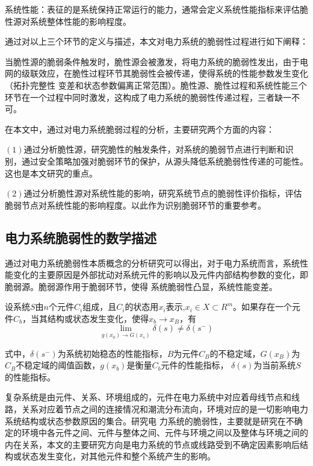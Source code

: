 系统性能：表征的是系统保持正常运行的能力，通常会定义系统性能指标来评估脆性源对系统整体性能的影响程度。

通过对以上三个环节的定义与描述，本文对电力系统的脆弱性过程进行如下阐释：

当脆性源的脆弱条件触发时，脆性源会被激发，将电力系统的脆弱性发出，由于电网的级联效应，在脆性过程环节其脆弱性会被传递，使得系统的性能参数发生变化（拓扑完整性
变差和状态参数偏离正常范围）。脆性源、脆性过程和系统性能三个环节在一个过程中同时激发，这构成了电力系统的脆弱性传递过程，三者缺一不可。

在本文中，通过对电力系统脆弱过程的分析，主要研究两个方面的内容：

$(1)$通过分析脆性源，研究脆性的触发条件，对系统的脆弱节点进行判断和识别，通过安全策略加强对脆弱环节的保护，从源头降低系统脆弱性传递的可能性。这也是本文研究的重点。

$(2)$通过分析脆性源对系统性能的影响，研究系统节点的脆弱性评价指标，评估脆弱节点对系统性能的影响程度。以此作为识别脆弱环节的重要参考。



\subsection{电力系统脆弱性的数学描述}
\label{sec:describtion}

通过对电力系统脆弱性本质概念的分析研究可以得出，对于电力系统而言，系统性能变化的主要原因是外部扰动对系统元件的影响以及元件内部结构参数的变化，即脆弱源。脆弱源作用于脆弱环节，使得
系统脆弱性凸显，系统性能变差。

设系统$S$由$n$个元件$C_i$组成，且$C_i$的状态用$x_i$表示,$x_i \in X \subset R^m$。如果存在一个元件$C_b$，当其结构或状态发生变化，使得$x_b \to x_B$，有
\begin{equation}
  \lim _{g\left(x_{0}\right) \rightarrow G\left(x_{s}\right)} \delta(s) \neq \delta\left(s^{-}\right)
  \end{equation}
 
式中，$\delta\left(s^{-}\right)$为系统初始稳态的性能指标，$B$为元件$C_B$的不稳定域，$G\left(x_{B}\right)$为$C_B$不稳定域的阈值函数，$g(x_b)$是衡量$C_b$元件的性能指标，
$\delta\left(s\right)$为当前系统$S$的性能指标。

复杂系统是由元件、关系、环境组成的，元件在电力系统中对应着母线节点和线路，关系对应着节点之间的连接情况和潮流分布流向，环境对应的是一切影响电力系统结构或状态参数原因的集合。研究电
力系统的脆弱性，主要就是研究在不确定的环境中各元件之间、元件与整体之间、元件与环境之间以及整体与环境之间的内在关系，本文的主要研究方向是电力系统的节点或线路受到不确定因素影响后结
构或状态发生变化，对其他元件和整个系统产生的影响。

